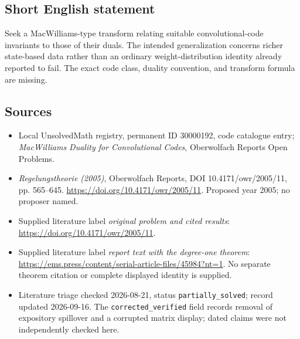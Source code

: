 \documentclass[11pt]{article}
\begin{document}
\subsection{Short English statement}
Seek a MacWilliams-type transform relating suitable convolutional-code invariants to those of their duals. The intended generalization concerns richer state-based data rather than an ordinary weight-distribution identity already reported to fail. The exact code class, duality convention, and transform formula are missing.
\subsection{Sources}
\begin{itemize}\item Local UnsolvedMath registry, permanent ID 30000192, code catalogue entry; \emph{MacWilliams Duality for Convolutional Codes}, Oberwolfach Reports Open Problems.\item \emph{Regelungstheorie (2005)}, Oberwolfach Reports, DOI 10.4171/owr/2005/11, pp. 565--645. \url{https://doi.org/10.4171/owr/2005/11}. Proposed year 2005; no proposer named.\item Supplied literature label \emph{original problem and cited results}: \url{https://doi.org/10.4171/owr/2005/11}.\item Supplied literature label \emph{report text with the degree-one theorem}: \url{https://ems.press/content/serial-article-files/45984?nt=1}. No separate theorem citation or complete displayed identity is supplied.\item Literature triage checked 2026-08-21, status \texttt{partially\_solved}; record updated 2026-09-16. The \texttt{corrected\_verified} field records removal of expository spillover and a corrupted matrix display; dated claims were not independently checked here.\end{itemize}
\end{document}
